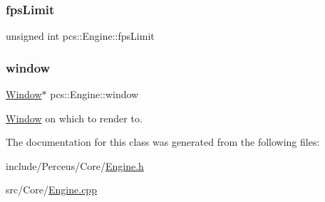 \subsubsection{\texorpdfstring{fps\+Limit}{fpsLimit}}
{\footnotesize\ttfamily unsigned int pcs\+::\+Engine\+::fps\+Limit\hspace{0.3cm}{\ttfamily [private]}}

\mbox{\label{classpcs_1_1Engine_a9d6dcbb93509389d86beb46ba33371a1}} 
\subsubsection{\texorpdfstring{window}{window}}
{\footnotesize\ttfamily \hyperlink{classpcs_1_1Window}{Window}$\ast$ pcs\+::\+Engine\+::window\hspace{0.3cm}{\ttfamily [private]}}



\hyperlink{classpcs_1_1Window}{Window} on which to render to. 



The documentation for this class was generated from the following files\+:\begin{DoxyCompactItemize}
\item 
include/\+Perceus/\+Core/\hyperlink{Engine_8h}{Engine.\+h}\item 
src/\+Core/\hyperlink{Engine_8cpp}{Engine.\+cpp}\end{DoxyCompactItemize}
